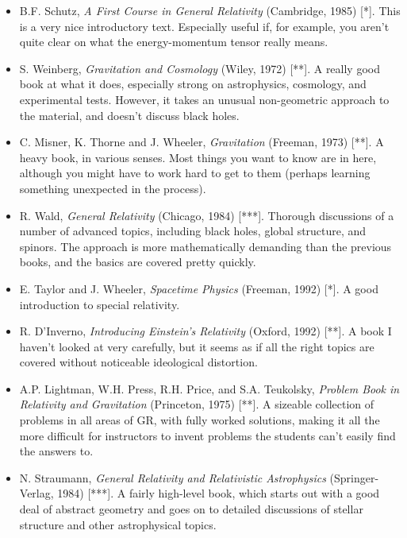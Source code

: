 \documentclass[12pt]{article}
\begin{document}
\begin{itemize}

\item B.F. Schutz, {\sl A First Course in General Relativity} (Cambridge,
1985) [*].  This is a very nice introductory text.  Especially useful
if, for example, you aren't quite clear on what the energy-momentum
tensor really means.

\item S. Weinberg, {\sl Gravitation and Cosmology} (Wiley, 1972) [**].
A really good book at what it does, especially strong on astrophysics, 
cosmology, and experimental tests.  However, it takes
an unusual non-geometric approach to the material, and 
doesn't discuss black holes.

\item C. Misner, K. Thorne and J. Wheeler, {\sl Gravitation}
(Freeman, 1973) [**].  A heavy book, in various senses.  Most things
you want to know are in here, although you might have to work hard
to get to them (perhaps learning something unexpected in the process).

\item R. Wald, {\sl General Relativity} (Chicago, 1984) [***].  Thorough
discussions of a number of advanced topics, including black holes,
global structure, and spinors.  The approach is more mathematically 
demanding than the previous books, and the basics are covered pretty quickly.

\item E. Taylor and J. Wheeler, {\sl Spacetime Physics} (Freeman, 1992)
[*].  A good introduction to special relativity.

\item R. D'Inverno, {\sl Introducing Einstein's Relativity} (Oxford, 1992)
[**].  A book I haven't looked at very carefully, but it seems as if all the
right topics are covered without noticeable ideological distortion.

\item A.P. Lightman, W.H. Press, R.H. Price, and S.A. Teukolsky,
{\sl Problem Book in Relativity and Gravitation} (Princeton, 1975) [**].
A sizeable collection of problems in all areas of GR, with fully
worked solutions, making it all the more difficult for instructors
to invent problems the students can't easily find the answers to.

\item N. Straumann, {\sl General Relativity and Relativistic Astrophysics}
(Springer-Verlag, 1984) [***].  A fairly high-level book, which starts out 
with a good deal of abstract geometry and goes on to detailed discussions
of stellar structure and other astrophysical topics.


\end{itemize}
\end{document}
